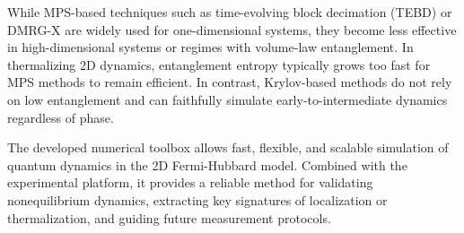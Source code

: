 While MPS-based techniques such as time-evolving block decimation (TEBD) or DMRG-X are widely used for one-dimensional systems, they become less effective in high-dimensional systems or regimes with volume-law entanglement. In thermalizing 2D dynamics, entanglement entropy typically grows too fast for MPS methods to remain efficient. In contrast, Krylov-based methods do not rely on low entanglement and can faithfully simulate early-to-intermediate dynamics regardless of phase.


The developed numerical toolbox allows fast, flexible, and scalable simulation of quantum dynamics in the 2D Fermi-Hubbard model. Combined with the experimental platform, it provides a reliable method for validating nonequilibrium dynamics, extracting key signatures of localization or thermalization, and guiding future measurement protocols.